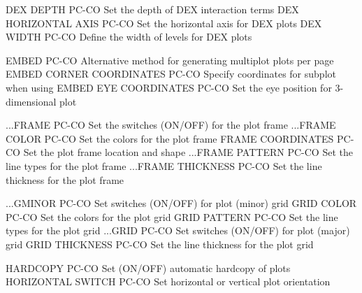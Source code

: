 DEX DEPTH                   PC-CO Set the depth of DEX interaction terms
DEX HORIZONTAL AXIS         PC-CO Set the horizontal axis for DEX plots
DEX WIDTH                   PC-CO Define the width of levels for DEX plots

EMBED                       PC-CO Alternative method for generating multiplot plots per page
EMBED CORNER COORDINATES    PC-CO Specify coordinates for subplot when using EMBED
EYE COORDINATES             PC-CO Set the eye position for 3-dimensional plot

...FRAME                    PC-CO Set the switches (ON/OFF) for the plot frame
...FRAME COLOR              PC-CO Set the colors for the plot frame
FRAME COORDINATES           PC-CO Set the plot frame location and shape
...FRAME PATTERN            PC-CO Set the line types for the plot frame
...FRAME THICKNESS          PC-CO Set the line thickness for the plot frame

...GMINOR                   PC-CO Set switches (ON/OFF) for plot (minor) grid
GRID COLOR                  PC-CO Set the colors for the plot grid
GRID PATTERN                PC-CO Set the line types for the plot grid
...GRID                     PC-CO Set switches (ON/OFF) for plot (major) grid
GRID THICKNESS              PC-CO Set the line thickness for the plot grid

HARDCOPY                    PC-CO Set (ON/OFF) automatic hardcopy of plots
HORIZONTAL SWITCH           PC-CO Set horizontal or vertical plot orientation

